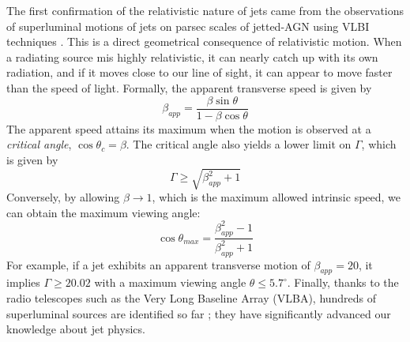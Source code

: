 The first confirmation of the relativistic nature of jets came from the observations of superluminal motions of jets on parsec scales of jetted-AGN using VLBI techniques \citep{whitney1971quasars}. This is a direct geometrical consequence of relativistic motion. When a radiating source mis highly relativistic, it can nearly catch up with its own radiation, and if it moves close to our line of sight, it can appear to move faster than the speed of light. Formally, the apparent transverse speed is given by
\begin{equation}
    \beta_{app}=\frac{\beta\sin{\theta}}{1-\beta\cos{\theta}}
\end{equation}
The apparent speed attains its maximum when the motion is observed at a \textit{critical angle}, $\cos{\theta_c}=\beta$. The critical angle also yields a lower limit on $\Gamma$, which is given by
\begin{equation}
    \Gamma\geq\sqrt{\beta_{app}^2+1}
\end{equation}
Conversely, by allowing $\beta\to1$, which is the maximum allowed intrinsic speed, we can obtain the maximum viewing angle:
\begin{equation}
    \cos{\theta_{max}}=\frac{\beta_{app}^2-1}{\beta_{app}^2+1}
\end{equation}
For example, if a jet exhibits an apparent transverse motion of $\beta_{app}=20$, it implies $\Gamma\geq20.02$ with a maximum viewing angle $\theta\leq5.7^\circ$.
Finally, thanks to the radio telescopes such as the Very Long Baseline Array (VLBA), hundreds of superluminal sources are  identified so far \citep[e.g.,][]{2018ApJS..234...12L}; they have significantly advanced our knowledge about jet physics.
